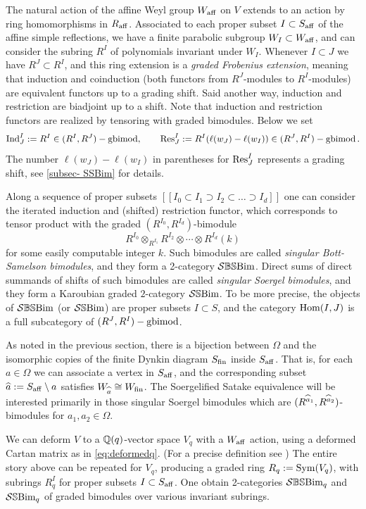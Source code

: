 {The natural action of the affine Weyl group $W_{\operatorname{aff}}$ on $V$ extends to an action by ring homomorphisms in $R_{\operatorname{aff}}$. Associated to each proper subset $I \subset S_{\operatorname{aff}}$ of the affine simple reflections, we have a finite parabolic subgroup $W_I \subset W_{\operatorname{aff}}$, and can consider the subring $R^I$ of polynomials invariant under $W_I$. Whenever $I \subset J$ we have $R^J \subset R^I$, and this ring extension is a \emph{graded Frobenius extension}, meaning that induction and coinduction (both functors from $R^J$-modules to $R^I$-modules) are equivalent functors up to a grading shift. Said another way, induction and restriction are biadjoint up to a shift. Note that induction and restriction functors are realized by tensoring with graded bimodules. Below we set
\begin{equation} \operatorname{Ind}^I_J := R^I \in (R^I, R^J)-\operatorname{gbimod}, \qquad \operatorname{Res}^I_J := R^I(\ell(w_J) - \ell(w_I)) \in (R^J,R^I)-\operatorname{gbimod}. \end{equation}
The number $\ell(w_J) - \ell(w_I)$ in parentheses for $\operatorname{Res}^I_J$ represents a grading shift, see \cref{subsec- SSBim} for details.

Along a sequence of proper subsets
$[[ I_0 \subset I_1 \supset I_2 \subset \ldots \supset I_d]]$
one can consider the iterated induction and (shifted) restriction functor, which corresponds to tensor product with the graded $(R^{I_0}, R^{I_d})$-bimodule
$$ R^{I_0} \otimes_{R^{I_1}} R^{I_2} \otimes \cdots \otimes R^{I_d}(k)$$
for some easily computable integer $k$. Such bimodules are called \emph{singular Bott-Samelson bimodules}, and they form a 2-category $\mathcal{S}\mathbb{BS}\text{Bim}$. Direct sums of direct summands of shifts of such bimodules are called \emph{singular Soergel bimodules}, and they form a Karoubian graded $2$-category $\mathcal{S}\mathbb{S}\text{Bim}$.  To be more precise, the objects of $\mathcal{S}\mathbb{BS}\text{Bim}$ (or $\mathcal{S}\mathbb{S}\text{Bim}$) are proper subsets $I \subset S$, and the category $\operatorname{Hom}(I,J)$ is a full subcategory of $(R^J,R^I)-\operatorname{gbimod}$. 

As noted in the previous section, there is a bijection between $\Omega$ and the isomorphic copies of the finite Dynkin diagram $S_{\operatorname{fin}}$ inside $S_{\operatorname{aff}}$. That is, for each $a \in \Omega$ we can associate a vertex in $S_{\operatorname{aff}}$, and the corresponding subset $\widehat{a} := S_{\operatorname{aff}} \setminus a$ satisfies $W_{\widehat{a}} \cong W_{\operatorname{fin}}$. The Soergelified Satake equivalence will be interested primarily in those singular Soergel bimodules which are $(R^{\widehat{a}_1}, R^{\widehat{a}_2})$-bimodules for $a_1, a_2 \in \Omega$.

We can deform $V$ to a $\mathbb{Q}(q)$-vector space $V_{q}$ with a $W_{\operatorname{aff}}$ action, using a deformed Cartan matrix as in \eqref{eq:deformedq}. 
(For a precise definition see ) 
The entire story above can be repeated for $V_{q}$, producing a graded ring $R_q := \operatorname{Sym}(V_{q})$, with subrings $R^I_{q}$ for proper subsets $I \subset S_{\operatorname{aff}}$. 
One obtain 2-categories $\mathcal{S}\mathbb{BS}\text{Bim}_{q}$ and $\mathcal{S}\mathbb{S}\text{Bim}_{q}$ of graded bimodules over various invariant subrings.

}
